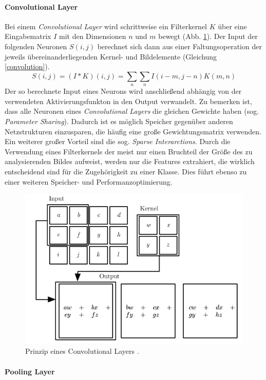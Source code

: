 \paragraph{Convolutional Layer}
Bei einem \textit{Convolutional Layer} wird schrittweise ein Filterkernel $K$ über eine Eingabematrix $I$ mit den Dimensionen $n$ und $m$ bewegt (Abb. \ref{cnns}). Der Input der folgenden Neuronen $S(i,j)$ berechnet sich dann aus einer Faltungsoperation der jeweils übereinanderliegenden Kernel- und Bildelemente (Gleichung \ref{convolution}). 
\begin{equation}\label{convolution}
	S(i,j)=(I\ast K)(i,j)=\sum_{n}\sum_{n} I(i-m,j-n)K(m,n)
\end{equation}
Der so berechnete Input eines Neurons wird anschließend abhängig von der verwendeten Aktivierungsfunkton in den Output verwandelt. Zu bemerken ist, dass alle Neuronen eines \textit{Convolutional Layers} die gleichen Gewichte haben (sog. \textit{Parameter Sharing}). Dadurch ist es möglich Speicher gegenüber anderen Netzstrukturen einzusparen, die häufig eine große Gewichtungsmatrix verwenden. Ein weiterer großer Vorteil sind die sog. \textit{Sparse Interarctions}. Durch die Verwendung eines Filterkernels der meist nur einen Bruchteil der Größe des zu analysierenden Bildes aufweist, werden nur die Features extrahiert, die wirklich entscheidend sind für die Zugehörigkeit zu einer Klasse. Dies führt ebenso zu einer weiteren Speicher- und Performanzoptimierung.
\begin{figure}[h!]
  \centering
  \includegraphics[width=12cm]{cnn_prinzip.png}
  \caption{Prinzip eines Convolutional Layers \cite[S.330]{Goodfellow-et-al-2016}.}
  \label{cnns}
\end{figure}
\paragraph{Pooling Layer}

